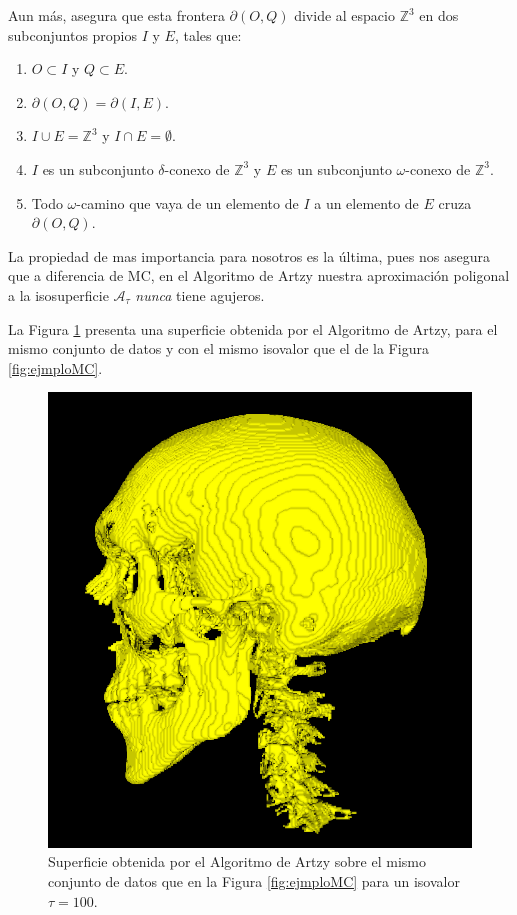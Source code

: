 Aun más, asegura que esta frontera $\partial (O, Q)$ divide al espacio $\mathbb{Z}^3$ en dos subconjuntos propios $I$ y $E$, tales que:

\begin{enumerate}
  \item $O \subset I$ y $Q \subset E$.
  \item $\partial (O, Q) = \partial (I, E)$.
  \item $I \cup E = \mathbb{Z}^3$ y $I \cap E = \emptyset$.
  \item $I$ es un subconjunto $\delta$-conexo de $\mathbb{Z}^3$ y $E$ es un subconjunto $\omega$-conexo de $\mathbb{Z}^3$.
  \item Todo $\omega$-camino que vaya de un elemento de $I$ a un elemento de $E$ cruza $\partial (O, Q)$.
\end{enumerate}

La propiedad de mas importancia para nosotros es la última, pues nos asegura que a diferencia de MC, en el Algoritmo de Artzy nuestra aproximación poligonal a la isosuperficie $\mathcal{A}_{\tau}$ \emph{nunca} tiene agujeros.

La Figura \ref{fig:ejmploArtzy} presenta una superficie obtenida por el Algoritmo de Artzy, para el mismo conjunto de datos y con el mismo isovalor que el de la Figura \ref{fig:ejmploMC}.

\begin{figure}[htp]
 \centering
  \includegraphics[scale=.45]{img/cap01/artzy}
  \caption[Ejemplo de superficie obtenida por el Algoritmo de Artzy]{Superficie obtenida por el Algoritmo de Artzy sobre el mismo conjunto de datos que en la Figura \ref{fig:ejmploMC} para un isovalor $\tau = 100$.}
  \label{fig:ejmploArtzy}
\end{figure}

